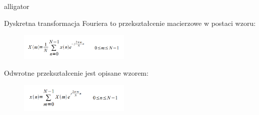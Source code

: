\documentclass[12pt]{article}
\begin{document}
\begin{labeling}{alligator}


\item [Dyskretna transformacja Fouriera] to przekształcenie macierzowe w postaci wzoru:
\\
\begin{figure}[h!]
 \centering
 \includegraphics[width=5.3cm]{DFTmacierzowa.PNG}
 \vspace{-0.3cm}
 \label{Widok_aplikacjis}
\end{figure}
Odwrotne przekształcenie jest opisane wzorem:
\begin{figure}[h!]
 \centering
 \includegraphics[width=5.3cm]{DFTmacierzowaOd.PNG}
 \vspace{-0.3cm}
 \label{Splot_indeks}
\end{figure}


\end{labeling}
\end{document}
